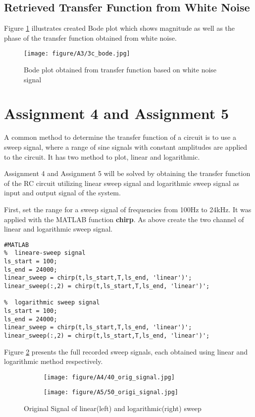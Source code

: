 \documentclass[
	a4paper,
	11pt,
]{article}
\begin{document}
\subsection{Retrieved Transfer Function from White Noise}
Figure \ref{fig:A3c} illustrates  created Bode plot which shows magnitude as
well as the phase of the transfer function obtained from white noise.

\begin{figure}[h!]
    \centerline{\texttt{[image: figure/A3/3c\_bode.jpg]}}
    \caption{Bode plot obtained from transfer function based on white noise signal}
    \label{fig:A3c}
\end{figure}

\newpage

\section{Assignment 4 and Assignment 5}
A common method to determine the transfer function of a circuit is to use a sweep signal, where a range of sine signals with constant amplitudes are applied to the circuit. It has two method to plot, linear and logarithmic.

Assignment 4 and Assignment 5 will be solved by obtaining the transfer function of the RC circuit utilizing linear sweep signal and logarithmic sweep signal as input and output signal of the system.

First, set the range for a sweep signal of frequencies from 100Hz to 24kHz. It was applied with the MATLAB function \textbf{chirp}. As above create the two channel of linear and logarithmic sweep signal.

\begin{verbatim}
#MATLAB
%  lineare-sweep signal
ls_start = 100;
ls_end = 24000;
linear_sweep = chirp(t,ls_start,T,ls_end, 'linear')';
linear_sweep(:,2) = chirp(t,ls_start,T,ls_end, 'linear')';

%  logarithmic sweep signal
ls_start = 100;
ls_end = 24000;
linear_sweep = chirp(t,ls_start,T,ls_end, 'linear')';
linear_sweep(:,2) = chirp(t,ls_start,T,ls_end, 'linear')';
\end{verbatim}

Figure \ref{fig:sweepsignal} presents the full recorded sweep signals, each obtained using linear and logarithmic method respectively.

\begin{figure}[h]
    \centering
    \begin{subfigure}[b]{0.47\textwidth}
        \centering
        \texttt{[image: figure/A4/40\_orig\_signal.jpg]}
    \end{subfigure}
    \hfill
    \begin{subfigure}[b]{0.47\textwidth}
        \centering
        \texttt{[image: figure/A5/50\_origi\_signal.jpg]}
    \end{subfigure}
    \caption{Original Signal of linear(left) and logarithmic(right) sweep}
    \label{fig:sweepsignal}
\end{figure}
\end{document}
